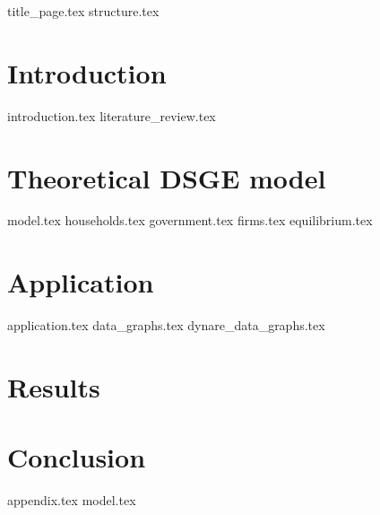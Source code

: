 \documentclass[12pt]{article}
\begin{document}
\begin{sloppypar}
{title_page.tex}
\pagebreak
{structure.tex}
\pagebreak
{}
\section{Introduction}
{introduction.tex}
{literature_review.tex}

\section{Theoretical DSGE model}
{model.tex}
{households.tex}
{government.tex}
{firms.tex}
{equilibrium.tex}
\section{Application} \label{application}
{application.tex}
{data_graphs.tex}
{dynare_data_graphs.tex}
\section{Results}
\section{Conclusion}
{appendix.tex}
{model.tex}

\end{sloppypar}
\end{document}
